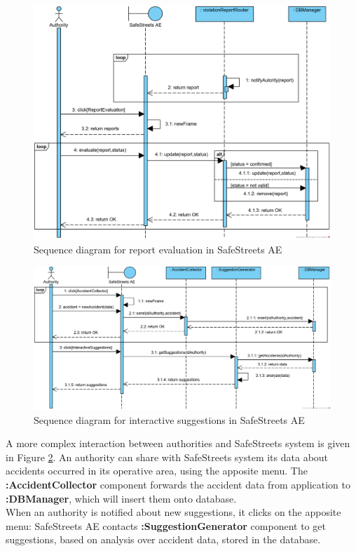 \documentclass{article}
\begin{document}
			\begin{figure}[H]
				\includegraphics [scale=0.8] {diagrams/DD_SeqD_ReportEvaluation.png}
				\caption[Sequence diagram]{Sequence diagram for report evaluation in SafeStreets AE}
				\label{fig:sd-reportEvaluation}
			\end{figure}
			
			\begin{figure}[H]
				\includegraphics [scale=0.7] {diagrams/DD_SeqD_Suggestions.png}
				\caption[Sequence diagram]{Sequence diagram for interactive suggestions in SafeStreets AE}
				\label{fig:sd-suggestions}
			\end{figure}
		
			A more complex interaction between authorities and SafeStreets system is given in Figure \ref{fig:sd-suggestions}.
			An authority can share with SafeStreets system its data about accidents occurred in its operative area, using the apposite menu. The \textbf{:AccidentCollector} component forwards the accident data from application to \textbf{:DBManager}, which will insert them onto database.\\
			When an authority is notified about new suggestions, it clicks on the apposite menu: SafeStreets AE contacts \textbf{:SuggestionGenerator} component to get suggestions, based on analysis over accident data, stored in the database. 
		
\end{document}

